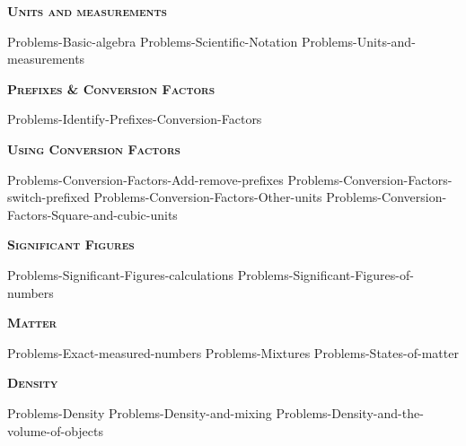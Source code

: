 \documentclass[main.tex]{subfiles}
\newcommand\chapterlabel{Ch-measurements}
\begin{document}
\newpage
\setdoublesep{0.35700 em}  %
\setatomsep{1.78500 em}    %
\setbondoffset{0.18265 em} %
\newcommand{\bondwidth}{0.06642 em} %
\setbondstyle{line width = \bondwidth}
\fancyhfoffset[E,O]{0pt}
\setlength{\columnsep}{30pt}
\begin{conclusion}
\end{conclusion}
\begin{multicols*}{2}\setcounter{numA}{1}



{\raggedright\textsc{\textbf{Units and measurements }}\par}
{Problems-Basic-algebra}
{Problems-Scientific-Notation}
{Problems-Units-and-measurements}


{\raggedright\textsc{\textbf{Prefixes \& Conversion Factors }}\par}
{Problems-Identify-Prefixes-Conversion-Factors}




{\raggedright\textsc{\textbf{Using Conversion Factors }}\par}
{Problems-Conversion-Factors-Add-remove-prefixes}
{Problems-Conversion-Factors-switch-prefixed}
{Problems-Conversion-Factors-Other-units}
{Problems-Conversion-Factors-Square-and-cubic-units}
{\raggedright\textsc{\textbf{Significant Figures }}\par}
{Problems-Significant-Figures-calculations}
{Problems-Significant-Figures-of-numbers}

{\raggedright\textsc{\textbf{Matter}}\par} %
{Problems-Exact-measured-numbers}
{Problems-Mixtures}%
{Problems-States-of-matter}%


{\raggedright\textsc{\textbf{Density}}\par}
{Problems-Density}
{Problems-Density-and-mixing}
{Problems-Density-and-the-volume-of-objects}











\end{multicols*}
\end{document}
